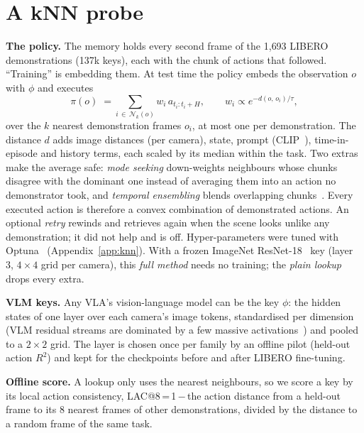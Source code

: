 \documentclass{article}
\begin{document}
\section{A kNN probe}
\label{sec:method}

\textbf{The policy.} The memory holds every second frame of the 1{,}693 LIBERO demonstrations (137k keys), each with the
chunk of actions that followed. ``Training'' is embedding them. At test time the policy embeds the observation $o$ with
$\phi$ and executes
\begin{equation}
  \pi(o)\;=\sum_{i\,\in\,\mathcal N_k(o)} w_i\, a_{t_i:t_i+H}, \qquad w_i \propto e^{-d(o,\,o_i)/\tau},
\end{equation}
over the $k$ nearest demonstration frames $o_i$, at most one per demonstration. The distance $d$ adds image distances
(per camera), state, prompt (CLIP~\citep{radford2021clip}), time-in-episode and history terms, each scaled by its median
within the task. Two extras make the average safe: \emph{mode seeking} down-weights neighbours whose chunks disagree
with the dominant one instead of averaging them into an action no demonstrator took, and \emph{temporal ensembling}
blends overlapping chunks~\citep{zhao2023act}. Every executed action is therefore a convex combination of demonstrated
actions. An optional \emph{retry} rewinds and retrieves again when the scene looks unlike any demonstration; it did not
help and is off. Hyper-parameters were tuned with Optuna~\citep{akiba2019optuna} (Appendix~\ref{app:knn}). With a frozen
ImageNet ResNet-18~\citep{he2016resnet} key (layer 3, $4\times4$ grid per camera), this \emph{full method} needs no
training; the \emph{plain lookup} drops every extra.

\textbf{VLM keys.} Any VLA's vision-language model can be the key $\phi$: the hidden states of one layer over each
camera's image tokens, standardised per dimension (VLM residual streams are dominated by a few massive
activations~\citep{sun2024massive}) and pooled to a $2\times2$ grid. The layer is chosen once per family by an offline
pilot (held-out action $R^2$) and kept for the checkpoints before and after LIBERO fine-tuning.

\textbf{Offline score.} A lookup only uses the nearest neighbours, so we score a key by its local action consistency,
LAC@8\,=\,1\,$-$\,the action distance from a held-out frame to its 8 nearest frames of other demonstrations, divided by
the distance to a random frame of the same task.
\end{document}
